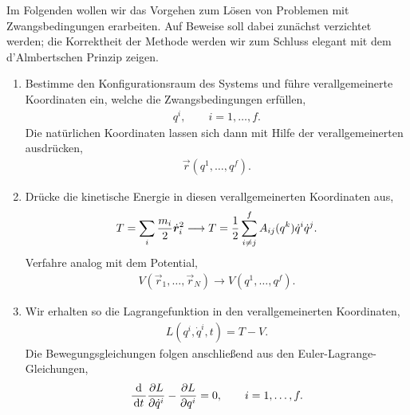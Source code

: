 Im Folgenden wollen wir das Vorgehen zum Lösen von Problemen mit
Zwangsbedingungen erarbeiten. Auf Beweise soll dabei zunächst verzichtet
werden; die Korrektheit der Methode werden wir zum Schluss elegant mit dem
d'Almbertschen Prinzip zeigen.

\begin{enumerate}[label=\arabic{*}.)]
  \item Bestimme den Konfigurationsraum des Systems und führe verallgemeinerte
  Koordinaten ein, welche die Zwangsbedingungen erfüllen,
\begin{align*}
q^i,\qquad i = 1,\ldots,f.
\end{align*}
Die natürlichen Koordinaten lassen sich dann mit Hilfe der verallgemeinerten
ausdrücken,
\begin{align*}
\vec{r}(q^1,\ldots,q^f).
\end{align*}
\item Drücke die kinetische Energie in diesen verallgemeinerten Koordinaten aus,
\begin{align*}
T = \sum_i \frac{m_i}{2}\dot{\bm{r}}_i^2 \longrightarrow T =
\frac{1}{2}\sum\limits_{i\neq j}^f A_{ij}(q^k)\dot{q}^i\dot{q}^j.
\end{align*}
Verfahre analog mit dem Potential,
\begin{align*}
V(\vec{r}_1,\ldots,\vec{r}_N) \longrightarrow V(q^1,\ldots,q^f).
\end{align*}
\item Wir erhalten so die Lagrangefunktion in den verallgemeinerten Koordinaten,
\begin{align*}
L(q^i,\dot{q}^i,t) = T-V.
\end{align*}
Die Bewegungsgleichungen folgen anschließend aus den Euler-Lagrange-Gleichungen,
\begin{align*}
\frac{\mathrm{d}}{\,\mathrm{d} t\,}\frac{\partial L}{\partial \dot{q}^i} - \frac{\partial
L}{\partial q^i} = 0,\qquad i=1,\ldots,f.
\end{align*}
\end{enumerate}

